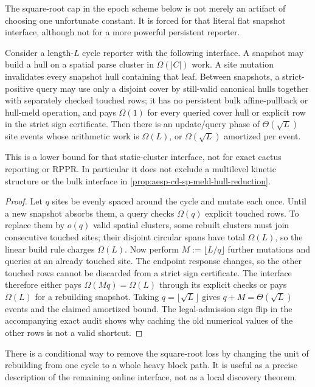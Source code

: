 The square-root cap in the epoch scheme below is not merely an artifact of
choosing one unfortunate constant.  It is forced for that literal flat
snapshot interface, although not for a more powerful persistent reporter.

\begin{proposition}
\label{prop:aesp-cd-cactus-static-cluster-stop}
Consider a length-$L$ cycle reporter with the following interface.  A snapshot
may build a hull on a spatial parse cluster in $\Omega(|C|)$ work.  A site
mutation invalidates every snapshot hull containing that leaf.  Between
snapshots, a strict-positive query may use only a disjoint cover by still-valid
canonical hulls together with separately checked touched rows; it has no
persistent bulk affine-pullback or hull-meld operation, and pays $\Omega(1)$
for every queried cover hull or explicit row in the strict sign certificate.
Then there is an
update/query phase of $\Theta(\sqrt L)$ site events whose arithmetic work is
$\Omega(L)$, or $\Omega(\sqrt L)$ amortized per event.

This is a lower bound for that static-cluster interface, not for exact cactus
reporting or RPPR.  In particular it does not exclude a multilevel kinetic
structure or the bulk interface in
\cref{prop:aesp-cd-sp-meld-hull-reduction}.
\end{proposition}

\begin{proof}
Let $q$ sites be evenly spaced around the cycle and mutate each once.  Until a
new snapshot absorbs them, a query checks $\Omega(q)$ explicit touched rows.
To replace them by $o(q)$ valid spatial clusters, some rebuilt clusters must
join consecutive touched sites; their disjoint circular spans have total
$\Omega(L)$, so the linear build rule charges $\Omega(L)$.  Now perform
$M:=\lfloor L/q\rfloor$ further mutations and queries at an already touched
site.  The endpoint response changes, so the other touched rows cannot be
discarded from a strict sign certificate.  The interface therefore either
pays $\Omega(Mq)=\Omega(L)$ through its explicit checks or pays
$\Omega(L)$ for a rebuilding snapshot.  Taking
$q=\lfloor\sqrt L\rfloor$ gives $q+M=\Theta(\sqrt L)$ events and the claimed
amortized bound.  The legal-admission sign flip in the accompanying exact
audit shows why caching the old numerical values of the other rows is not a
valid shortcut.
\end{proof}

There is a conditional way to remove the square-root loss by changing the
unit of rebuilding from one cycle to a whole heavy block path.  It is useful
as a precise description of the remaining online interface, not as a local
discovery theorem.

